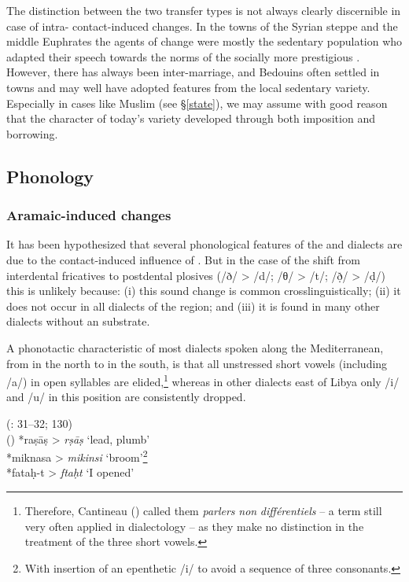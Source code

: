 \documentclass[output=paper]{langsci/langscibook}
\begin{document}
The distinction between the two {transfer} types is not always clearly discern\-ible in case of intra- contact-induced changes. In the towns of the Syrian steppe and the middle Euphrates the agents of change were mostly the sedentary population who adapted their speech towards the norms of the socially more {prestigious} . However, there has always been inter-marriage, and Bedouins often settled in towns and may well have adopted features from the local sedentary variety. Especially in cases like Muslim  (see §\ref{state}), we may assume with good reason that the  character of today’s variety developed through both {imposition} and borrowing. 

  \subsection{Phonology}\largerpage
 \subsubsection{Aramaic-induced changes} 

It has been hypothesized that several phonological features of the  and  dialects are due to the contact-induced influence of . But in the case of the shift from interdental fricatives to postdental plosives (/ð/ > /d/; /θ/ > /t/; /ð̣/ > /ḍ/) this is unlikely because: (i) this sound change is common crosslinguistically; (ii) it does not occur in all dialects of the region; and (iii) it is found in many other  dialects without an  {substrate}. 

A phonotactic characteristic of most dialects spoken along the Mediterranean, from  in the north to  in the south, is that all unstressed short vowels (including /a/) in open syllables are elided,\footnote{Therefore, Cantineau (\citeyear[108]{Cantineau1960book}) called them \textit{parlers} \textit{non} \textit{différentiels} – a term still very often applied in  dialectology – as they make no distinction in the treatment of the three short vowels.} whereas in other dialects east of Libya only /i/ and /u/ in this position are consistently dropped.

\ea
{  (\citealt{Procházka2002Cukurova}: 31--32; 130)}\\
  \textup{  ()} *raṣāṣ > \textit{rṣāṣ}  \textup{‘lead, plumb’\\
} *miknasa > \textit{mikinsi} ‘\textup{broom’}\footnote{With insertion of an epenthetic /i/ to avoid a sequence of three consonants.}\\
*fataḥ-t > \textit{ftaḥt} ‘\textup{I opened’}\\
  \z
  
\end{document}
